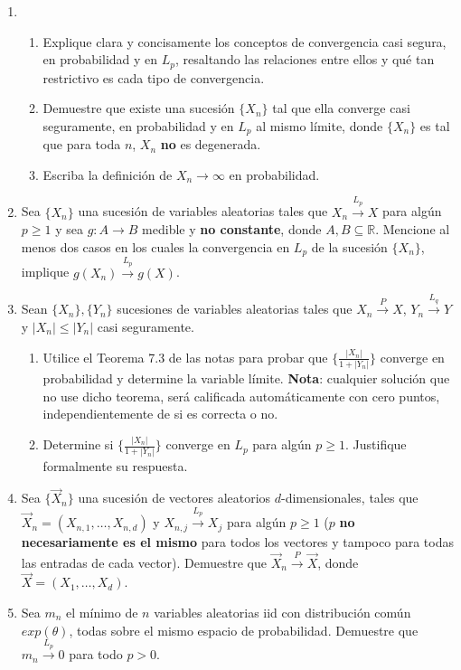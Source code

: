 \documentclass[10pt]{extarticle}
\newcommand{\rr}{\mathbb{R}}
\begin{document}
\begin{enumerate}
\item \begin{enumerate}
\item Explique clara y concisamente los conceptos de convergencia casi segura, en probabilidad y en $L_p$, resaltando las relaciones entre ellos y qué tan restrictivo es cada tipo de convergencia.

\item Demuestre que existe una sucesión $\{X_n\}$ tal que ella converge casi seguramente, en probabilidad y en $L_p$ al mismo límite, donde $\{X_n\}$ es tal que para toda $n$, $X_n$ \textbf{no} es degenerada.

\item Escriba la definición de $X_n\to\infty$ en probabilidad.
\end{enumerate}

\item Sea $\{X_n\}$ una sucesión de variables aleatorias tales que $X_n\overset{L_p}{\to} X$ para algún $p\geq 1$ y sea $g:A\to B$ medible y \textbf{no constante}, donde $A,B\subseteq \rr$. Mencione al menos dos casos en los cuales la convergencia en $L_p$ de la sucesión $\{X_n\}$, implique $g(X_n)\overset{L_p}{\to} g(X)$.

\item Sean $\{X_n\},\{Y_n\}$ sucesiones de variables aleatorias tales que $X_n\overset{P}{\to} X$, $Y_n\overset{L_q}{\to} Y$ y $|X_n|\leq |Y_n|$ casi seguramente. 

\begin{enumerate}
\item Utilice el Teorema 7.3 de las notas para probar que $\big\{\frac{|X_n|}{1+|Y_n|}\big\}$ converge en probabilidad y determine la variable límite. \textbf{Nota}: cualquier solución que no use dicho teorema, será calificada automáticamente con cero puntos, independientemente de si es correcta o no.

\item Determine si $\big\{\frac{|X_n|}{1+|Y_n|}\big\}$ converge en $L_p$ para algún $p\geq 1$. Justifique formalmente su respuesta.
\end{enumerate}

\item Sea $\{\vec{X}_n\}$ una sucesión de vectores aleatorios $d$-dimensionales, tales que $\vec{X}_n=(X_{n,1},\dots,X_{n,d})$ y $X_{n,j}\overset{L_p}{\to}X_j$ para algún $p\geq 1$ ($p$ \textbf{no necesariamente es el mismo} para todos los vectores y tampoco para todas las entradas de cada vector). Demuestre que $\vec{X}_n\overset{P}{\to} \vec{X}$, donde $\vec{X}=(X_1,\dots,X_d)$.

\item Sea $m_n$ el mínimo de $n$ variables aleatorias iid con distribución común $exp(\theta)$, todas sobre el mismo espacio de probabilidad. Demuestre que $m_n\overset{L_p}{\to}0$ para todo $p>0$.
\end{enumerate}
\end{document}
